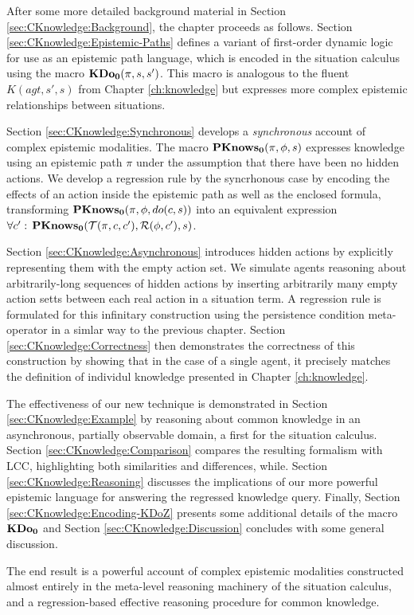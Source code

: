 After some more detailed background material in Section \ref{sec:CKnowledge:Background},
the chapter proceeds as follows. Section \ref{sec:CKnowledge:Epistemic-Paths}
defines a variant of first-order dynamic logic for use as an epistemic
path language, which is encoded in the situation calculus using the
macro $\mathbf{KDo_{0}}(\pi,s,s')$. This macro is analogous to the fluent $K(agt,s',s)$
from Chapter \ref{ch:knowledge} but expresses more complex epistemic
relationships between situations.

Section \ref{sec:CKnowledge:Synchronous} develops a \emph{synchronous}
account of complex epistemic modalities. The macro $\mathbf{PKnows_{0}}(\pi,\phi,s)$
expresses knowledge using an epistemic path $\pi$ under the assumption
that there have been no hidden actions. We develop a regression rule
by the syncrhonous case by encoding the effects of an action inside
the epistemic path as well as the enclosed formula, transforming $\mathbf{PKnows_{0}}(\pi,\phi,do(c,s))$
into an equivalent expression $\forall c':\,\mathbf{PKnows_{0}}(\mathcal{T}(\pi,c,c'),\mathcal{R}(\phi,c'),s)$.

Section \ref{sec:CKnowledge:Asynchronous} introduces hidden actions
by explicitly representing them with the empty action set. We simulate
agents reasoning about arbitrarily-long sequences of hidden actions
by inserting arbitrarily many empty action setts between each real
action in a situation term. A regression rule is formulated for this
infinitary construction using the persistence condition meta-operator
in a simlar way to the previous chapter. Section \ref{sec:CKnowledge:Correctness}
then demonstrates the correctness of this construction by showing
that in the case of a single agent, it precisely matches the definition
of individul knowledge presented in Chapter \ref{ch:knowledge}.

The effectiveness of our new technique is demonstrated in Section
\ref{sec:CKnowledge:Example} by reasoning about common knowledge
in an asynchronous, partially observable domain, a first for the situation
calculus. Section \ref{sec:CKnowledge:Comparison} compares the resulting
formalism with LCC, highlighting both similarities and differences,
while. Section \ref{sec:CKnowledge:Reasoning} discusses the implications
of our more powerful epistemic language for answering the regressed
knowledge query. Finally, Section \ref{sec:CKnowledge:Encoding-KDoZ}
presents some additional details of the macro $\mathbf{KDo_{0}}$ and Section
\ref{sec:CKnowledge:Discussion} concludes with some general discussion.

The end result is a powerful account of complex epistemic modalities
constructed almost entirely in the meta-level reasoning machinery
of the situation calculus, and a regression-based effective reasoning
procedure for common knowledge.



